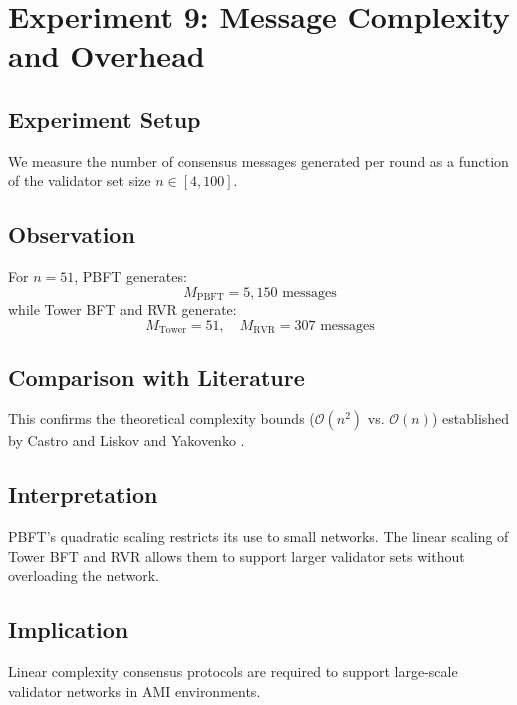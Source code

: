 \documentclass[12pt, oneside, a4paper]{report}
\theoremstyle{definition}
\theoremstyle{remark}
\begin{document}
\bigskip

\section{Experiment 9: Message Complexity and Overhead}
\label{sec:res:e9}

\subsection{Experiment Setup}
We measure the number of consensus messages generated per round as a function of the validator set size $n \in [4, 100]$.

\subsection{Observation}
For $n=51$, PBFT generates:
\begin{equation}
M_{\mathrm{PBFT}} = 5{,}150 \text{ messages}
\end{equation}
while Tower BFT and RVR generate:
\begin{equation}
M_{\mathrm{Tower}} = 51, \quad M_{\mathrm{RVR}} = 307 \text{ messages}
\end{equation}

\subsection{Comparison with Literature}
This confirms the theoretical complexity bounds ($\mathcal{O}(n^2)$ vs. $\mathcal{O}(n)$) established by Castro and Liskov \cite{castro1999} and Yakovenko \cite{yakovenko2018}.

\subsection{Interpretation}
PBFT's quadratic scaling restricts its use to small networks. The linear scaling of Tower BFT and RVR allows them to support larger validator sets without overloading the network.

\subsection{Implication}
Linear complexity consensus protocols are required to support large-scale validator networks in AMI environments.
\end{document}
